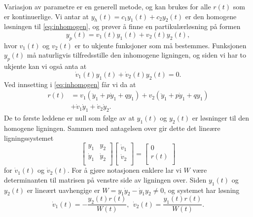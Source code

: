 \documentclass{article}
\theoremstyle{definition}
\theoremstyle{remark}
\begin{document}
\begin{multicols*}{2}
Variasjon av parametre er en generell metode, og kan brukes for alle $r(t)$ som er kontinuerlige. Vi antar at $y_h(t) = c_1 y_1(t) + c_2 y_2(t)$ er den homogene løsningen til \eqref{eq:inhomogen}, og prøver å finne en partikulærløsning på formen
\begin{equation*}
  y_p(t) = v_1(t) y_1(t) + v_2(t) y_2(t),
\end{equation*}
hvor $v_1(t)$ og $v_2(t)$ er to ukjente funksjoner som må bestemmes. Funksjonen $y_p(t)$ må naturligvis tilfredsstille den inhomogene ligningen, og siden vi har to ukjente kan vi også anta at
\begin{equation*}
  \dot{v}_1(t) y_1(t) + \dot{v}_2(t) y_2(t) = 0.
\end{equation*}
Ved innsetting i \eqref{eq:inhomogen} får vi da at
\begin{equation*}
  \begin{split}
    r(t) & = v_1 (\ddot{y}_1 + p \dot{y}_1 + q y_1) + v_2 (\ddot{y}_1 + p \dot{y}_1 + q y_1) \\
    & + \dot{v}_1 \dot{y}_1 + \dot{v}_2 \dot{y}_2.
  \end{split}
\end{equation*}
De to første leddene er null som følge av at $y_1(t)$ og $y_2(t)$ er løsninger til den homogene ligningen. Sammen med antagelsen over gir dette det lineære ligningssystemet
\begin{equation*}
  \begin{bmatrix}
    y_1 & y_2 \\
    \dot{y}_1 & \dot{y}_2 \\
  \end{bmatrix}
  \begin{bmatrix}
    \dot{v}_1 \\
    \dot{v}_2 \\
  \end{bmatrix}
  =
  \begin{bmatrix}
    0 \\
    r(t) \\
  \end{bmatrix}
\end{equation*}
for $\dot{v}_1(t)$ og $\dot{v}_2(t)$. For å gjøre notasjonen enklere lar vi $W$ være determinanten til matrisen på venstre side av ligningen over. Siden $y_1(t)$ og $y_2(t)$ er lineært uavhengige er $W = y_1 \dot{y}_2 - \dot{y}_1 y_2 \neq 0$, og systemet har løsning
\begin{equation*}
  \dot{v}_1(t) = -\frac{y_2(t) r(t)}{W(t)}, \ \ \dot{v}_2(t) = \frac{y_1(t) r(t)}{W(t)}.

\end{equation*}
\end{multicols*}
\end{document}
